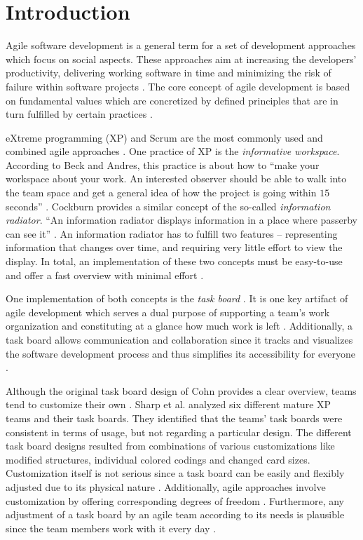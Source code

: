 \documentclass{llncs}
\begin{document}
\section{Introduction}
Agile software development is a general term for a set of development approaches which focus on social aspects. These approaches aim at increasing the developers' productivity, delivering working software in time and minimizing the risk of failure within software projects \cite{Sharp.2009}. The core concept of agile development is based on fundamental values which are concretized by defined principles that are in turn fulfilled by certain practices \cite{Beck.2001}.

eXtreme programming (XP) \cite{Beck.2007} and Scrum \cite{Schwaber.2002} are the most commonly used and combined agile approaches \cite{Azizyan.2011, Pikkarainen.2008}.
One practice of XP is the \textit{informative workspace}. According to Beck and Andres, this practice is about how to ``make your workspace about your work. An interested observer should be able to walk into the team space and get a general idea of how the project is going within $15$ seconds'' \cite[p. 39f.]{Beck.2007}.
Cockburn \cite{Cockburn.2009} provides a similar concept of the so-called 
\textit{information radiator}. ``An information radiator displays information 
in a place where passerby can see it'' \cite[p. 114]{Cockburn.2009}. An 
information radiator has to fulfill two features -- representing information 
that changes over time, and requiring very little effort to view the display. 
In total, an implementation of these two concepts must be easy-to-use and offer 
a fast overview with minimal effort \cite{Rubart.2009}.

One implementation of both concepts is the \textit{task board} 
\cite{Sharp.2006}. It is one key artifact of agile development 
\cite{Azizyan.2011, Katsma.2013} which serves a dual purpose of supporting a 
team's work organization and constituting at a glance how much work is left 
\cite{Cohn.2012, Petre.2012}. Additionally, a task board allows communication 
and collaboration since it tracks and visualizes the software development 
process and thus simplifies its accessibility for everyone \cite{Perry.2008, 
Pikkarainen.2008}.

Although the original task board design of Cohn \cite{Cohn.2012} provides a 
clear overview, teams tend to customize their own \cite{Sharp.2008}. Sharp et 
al. \cite{Sharp.2009} analyzed six different mature XP teams and their task 
boards. They identified that the teams' task boards were consistent in terms of 
usage, but not regarding a particular design.
The different task board designs resulted from combinations of various 
customizations like modified structures, individual colored codings and changed 
card sizes. Customization itself is not serious since a task board can be 
easily and flexibly adjusted due to its physical nature \cite{Hajratwala.2012, 
Sharp.2008}. Additionally, agile approaches involve customization by offering 
corresponding degrees of freedom \cite{Pikkarainen.2008, Sutherland.2009}. 
Furthermore, any adjustment of a task board by an agile team according to its 
needs is plausible since the team members work with it every day 
\cite{Sharp.2008}.
\end{document}
